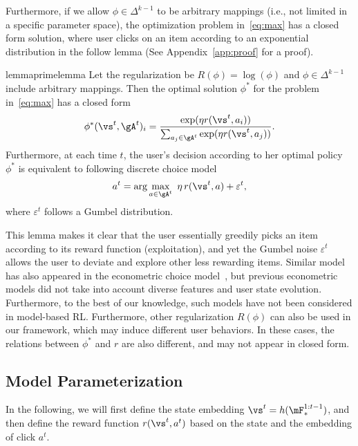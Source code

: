 \documentclass{article} %
\newcommand{\xc}[1]{{\color{blue}{\bf\sf [#1]}}}
\newcommand{\Li}[1]{{\color{cyan}{\bf\sf [Li: #1]}}}
\begin{document}




Furthermore, if we allow $\phi \in \Delta^{k-1}$ to be arbitrary mappings (i.e., not limited in a specific parameter space), the optimization problem in~\eqref{eq:max} has a closed form solution, where user clicks on an item according to an exponential distribution in the follow lemma (See Appendix~\ref{app:proof} for a proof).
\begin{restatable}{lemma}{primelemma}\label{lm:lemma1}
Let the regularization be $R(\phi) = \log(\phi)$ and $\phi \in \Delta^{k-1}$ include arbitrary mappings. Then the optimal solution $\phi^*$ for the problem in~\eqref{eq:max} has a closed form
\begin{equation}\label{eq:exp}
	\phi^\ast(\vs^t,\gA^t)_i = \dfrac{\exp(\eta r(\vs^t, a_i))}{\sum_{a_j \in \gA^t}\exp(\eta r(\vs^t, a_j))}.
\end{equation}
Furthermore, at each time $t$, the user's decision according to her optimal policy $\phi^*$ is equivalent to \Li{\st{he} the} following discrete choice model
{\small \begin{equation}\label{eq:gumbel}
 	a^t = \arg\max_{a \in \gA^t }~\eta\, r(\vs^t, a) + \varepsilon^t,
 \end{equation}}
 where $\varepsilon^t$ follows a Gumbel distribution.
\end{restatable}
This lemma makes it clear that the user essentially greedily picks an item according to its reward function (exploitation), and yet the Gumbel noise $\varepsilon^t$ allows the user to deviate and explore other less rewarding items. Similar model has also appeared in the econometric choice model~\citep{Manski75,McFa73}, but previous econometric models did not take into account diverse features and user state evolution. Furthermore, to the best of our knowledge, such models have not been considered in model-based RL. Furthermore, other regularization $R(\phi)$ can also be used in our framework, which may induce different user behaviors. In these cases, the relations between $\phi^*$ and $r$ are also different, and may not appear in closed form.
\vspace{-3mm}
\subsection{Model Parameterization}
\vspace{-3mm}
In the following, we will first define the state embedding $\vs^t = h(\mF^{1:t-1}_\ast)$, and then define the reward function $r(\vs^t, a^t)$ based on the state and the embedding of click $a^t$.
\end{document}
